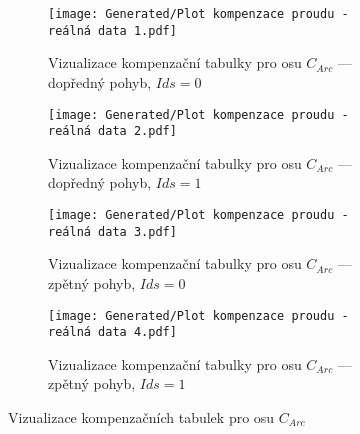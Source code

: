 \begin{landscapeimagepage}
    \begin{figure}[H]
        \centering
        \begin{subfigure}{.5\textheight}
            \centering
            \texttt{[image: Generated/Plot kompenzace proudu - reálná data 1.pdf]}
            \caption{Vizualizace kompenzační tabulky pro osu $C_{Arc}$ --- dopředný pohyb, $Ids = 0$}
            \label{fig:kompenzace proudu reálná data 1}
        \end{subfigure}
        \vspace{0.5cm}
        \hspace{2.5cm}
        \begin{subfigure}{.5\textheight}
            \centering
            \texttt{[image: Generated/Plot kompenzace proudu - reálná data 2.pdf]}
            \caption{Vizualizace kompenzační tabulky pro osu $C_{Arc}$ --- dopředný pohyb, $Ids = 1$}
            \label{fig:kompenzace proudu reálná data 2}
        \end{subfigure}
        \vspace{0.5cm}
        \begin{subfigure}{.5\textheight}
            \centering
                    \texttt{[image: Generated/Plot kompenzace proudu - reálná data 3.pdf]}
                    \caption{Vizualizace kompenzační tabulky pro osu $C_{Arc}$ --- zpětný pohyb, $Ids = 0$}
                    \label{fig:kompenzace proudu reálná data 3}
        \end{subfigure}
        \hspace{2.5cm}
        \begin{subfigure}{.5\textheight}
                \centering
            \texttt{[image: Generated/Plot kompenzace proudu - reálná data 4.pdf]}
            \caption{Vizualizace kompenzační tabulky pro osu $C_{Arc}$ --- zpětný pohyb, $Ids = 1$}
            \label{fig:kompenzace proudu reálná data 4}
        \end{subfigure}
        \caption{Vizualizace kompenzačních tabulek pro osu $C_{Arc}$}
        \label{fig: Vizualizace kompenzační tabulek pro osu CArc}
    \end{figure}
\end{landscapeimagepage}



